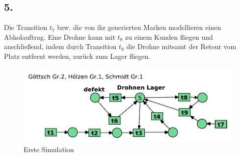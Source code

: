 \documentclass[12pt, paper=a4]{article}
\begin{document}
\newpage
\subsection*{5.}
Die Transition $t_7$ bzw. die von ihr generierten Marken modellieren einen Abholauftrag. Eine Drohne kann mit $t_8$ zu einem Kunden fliegen und anschließend, indem durch Transition $t_9$ die Drohne mitsamt der Retour vom Platz entfernt werden, zurück zum Lager fliegen.\\

\begin{figure}[h!]
	\centering
	\includegraphics[scale=0.8]{8-5-5.pdf}
	\caption{Erste Simulation}
\end{figure}
\end{document}
